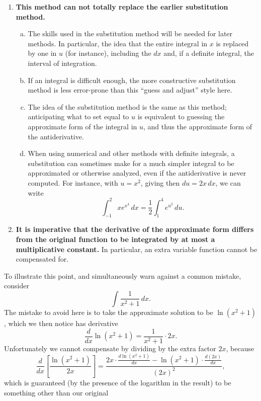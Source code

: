 \begin{enumerate}[{\bf(I)}]
\item {\bf This method can not totally replace the earlier substitution
      method.} 
  \begin{enumerate}[(a)]
      \item The skills used in the substitution method will be
            needed for later methods.  In particular, the idea
            that the entire integral in $x$ is replaced
            by one in $u$ (for instance), including the $dx$
            and, if a definite integral, the interval of integration.
      \item If an integral is difficult enough, the more constructive
            substitution method is less error-prone than
            this ``guess and adjust'' style here.
      \item The idea of the substitution method is the same as
            this method; anticipating what to set equal to $u$ is
            equivalent to guessing the approximate form of the
            integral in $u$, and thus the approximate form of
            the antiderivative.
      \item When using numerical and other methods with definite
            integrals, a substitution can sometimes make for a
            much simpler integral to be approximated or otherwise 
            analyzed, even if the antiderivative is never computed. 
            For instance, with $u=x^2$, giving then $du=2x\,dx$, we can write
            $$\int_{-1}^2 xe^{x^4}\,dx=\frac12\int_{1}^4e^{u^2}\,du.$$
       \end{enumerate}
\item {\bf It is imperative that the derivative of the approximate form
differs from the original function to be integrated by at most a
{multiplicative constant}.}  In particular, an extra
variable function cannot be compensated for.  
\end{enumerate}
To illustrate this point, and simultaneously warn against a 
common mistake, consider 
$$\int\frac1{x^2+1}\,dx.$$
The mistake to avoid here is to take the approximate solution to be
$\ln(x^2+1)$, which we then notice has derivative
$$\frac{d}{dx}\ln(x^2+1)=\frac1{x^2+1}\cdot2x.$$
Unfortunately we cannot compensate by dividing by 
the extra factor $2x$, because\footnotemark
$$\frac{d}{dx}\left[\frac{\ln(x^2+1)}{2x}\right]=
\frac{2x\cdot\frac{d\ln(x^2+1)}{dx}-\ln(x^2+1)\cdot\frac{d(2x)}{dx}}{(2x)^2},$$
which is guaranteed (by the presence of the logarithm in
the result) to be something other than our original 
